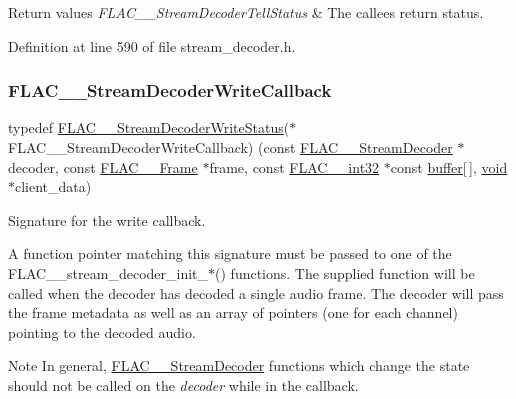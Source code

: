 \begin{DoxyRetVals}{Return values}
{\em F\+L\+A\+C\+\_\+\+\_\+\+Stream\+Decoder\+Tell\+Status} & The callee\textquotesingle{}s return status. \\
\hline
\end{DoxyRetVals}


Definition at line 590 of file stream\+\_\+decoder.\+h.

\mbox{\label{group__flac__stream__decoder_ga61e48dc2c0d2f6c5519290ff046874a4}} 
\subsubsection{\texorpdfstring{FLAC\_\_StreamDecoderWriteCallback}{FLAC\_\_StreamDecoderWriteCallback}}
{\footnotesize\ttfamily typedef \mbox{\hyperlink{group__flac__stream__decoder_ga73f67eb9e0ab57945afe038751bc62c8}{F\+L\+A\+C\+\_\+\+\_\+\+Stream\+Decoder\+Write\+Status}}($\ast$ F\+L\+A\+C\+\_\+\+\_\+\+Stream\+Decoder\+Write\+Callback) (const \mbox{\hyperlink{struct_f_l_a_c_____stream_decoder}{F\+L\+A\+C\+\_\+\+\_\+\+Stream\+Decoder}} $\ast$decoder, const \mbox{\hyperlink{struct_f_l_a_c_____frame}{F\+L\+A\+C\+\_\+\+\_\+\+Frame}} $\ast$frame, const \mbox{\hyperlink{ordinals_8h_a33fd77bfe6d685541a0c034a75deccdc}{F\+L\+A\+C\+\_\+\+\_\+int32}} $\ast$const \mbox{\hyperlink{_s_d_l__opengl__glext_8h_a76461e97a098d2c9ae20ac193d3825ae}{buffer}}\mbox{[}$\,$\mbox{]}, \mbox{\hyperlink{_s_d_l__opengles2__gl2ext_8h_ae5d8fa23ad07c48bb609509eae494c95}{void}} $\ast$client\+\_\+data)}

Signature for the write callback.

A function pointer matching this signature must be passed to one of the F\+L\+A\+C\+\_\+\+\_\+stream\+\_\+decoder\+\_\+init\+\_\+$\ast$() functions. The supplied function will be called when the decoder has decoded a single audio frame. The decoder will pass the frame metadata as well as an array of pointers (one for each channel) pointing to the decoded audio.

\begin{DoxyNote}{Note}
In general, \mbox{\hyperlink{struct_f_l_a_c_____stream_decoder}{F\+L\+A\+C\+\_\+\+\_\+\+Stream\+Decoder}} functions which change the state should not be called on the {\itshape decoder} while in the callback.
\end{DoxyNote}

